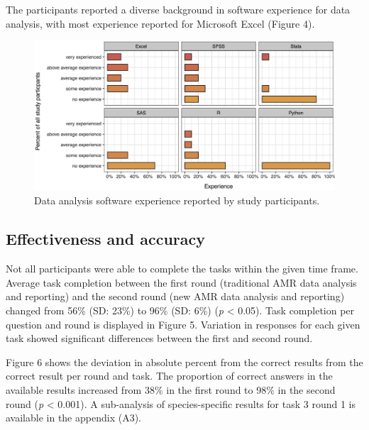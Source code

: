 \documentclass[
]{book}
\begin{document}
The participants reported a diverse background in software experience for data analysis, with most experience reported for Microsoft Excel (Figure 4).

\begin{figure}

{\centering \includegraphics[width=1\linewidth]{images/06-04} 

}

\caption{Data analysis software experience reported by study participants.}\label{fig:fig6-4}
\end{figure}

\hypertarget{effectiveness-and-accuracy}{%
\subsection{Effectiveness and accuracy}\label{effectiveness-and-accuracy}}

Not all participants were able to complete the tasks within the given time frame. Average task completion between the first round (traditional AMR data analysis and reporting) and the second round (new AMR data analysis and reporting) changed from 56\% (SD: 23\%) to 96\% (SD: 6\%) (\emph{p} \textless{} 0.05). Task completion per question and round is displayed in Figure 5. Variation in responses for each given task showed significant differences between the first and second round.

Figure 6 shows the deviation in absolute percent from the correct results from the correct result per round and task. The proportion of correct answers in the available results increased from 38\% in the first round to 98\% in the second round (\emph{p} \textless{} 0.001). A sub-analysis of species-specific results for task 3 round 1 is available in the appendix (A3).
\end{document}
